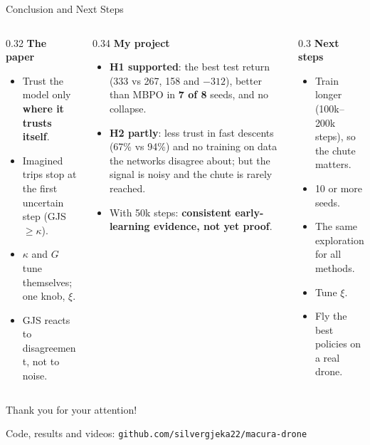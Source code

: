 \documentclass[aspectratio=169,10pt]{beamer}
\begin{document}
\begin{frame}{Conclusion and Next Steps}
  \begin{columns}[T]
    \begin{column}{0.32\textwidth}
      \textbf{The paper}
      \begin{itemize}\footnotesize
        \item Trust the model only \textbf{where it trusts itself}.
        \item Imagined trips stop at the first uncertain step (GJS $\ge\kappa$).
        \item $\kappa$ and $G$ tune themselves; one knob, $\xi$.
        \item GJS reacts to disagreement, not to noise.
      \end{itemize}
    \end{column}
    \begin{column}{0.34\textwidth}
      \textbf{My project}
      \begin{itemize}\footnotesize
        \item \textbf{H1 supported}: the best test return (333 vs 267, 158 and $-312$), better than MBPO in
              \textbf{7 of 8} seeds, and no collapse.
        \item \textbf{H2 partly}: less trust in fast descents (67\% vs 94\%) and no training on data the networks
              disagree about; but the signal is noisy and the chute is rarely reached.
        \item With 50k steps: \textbf{consistent early-learning evidence, not yet proof}.
      \end{itemize}
    \end{column}
    \begin{column}{0.3\textwidth}
      \textbf{Next steps}
      \begin{itemize}\footnotesize
        \item Train longer (100k--200k steps), so the chute matters.
        \item 10 or more seeds.
        \item The same exploration for all methods.
        \item Tune $\xi$.
        \item Fly the best policies on a real drone.
      \end{itemize}
    \end{column}
  \end{columns}
\end{frame}

\begin{frame}[plain]
  \vfill\centering
  {\color{black}Thank you for your attention!\par}
  \vspace{1em}
  {\small Code, results and videos: \texttt{github.com/silvergjeka22/macura-drone}}
  \vfill
\end{frame}
\end{document}
